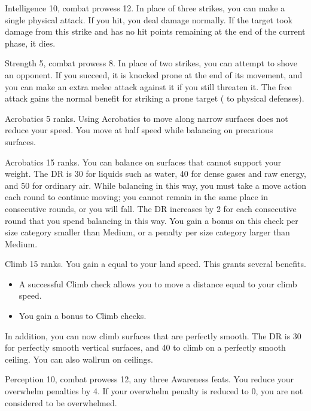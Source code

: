 \featpres Intelligence 10, combat prowess 12.
\featben In place of three strikes, you can make a single physical attack.
If you hit, you deal damage normally.
If the target took damage from this strike and has no hit points remaining at the end of the current phase, it dies.

\featpres Strength 5, combat prowess 8.
\featben In place of two strikes, you can attempt to shove an opponent.
If you succeed, it is knocked prone at the end of its movement, and you can make an extra melee attack against it if you still threaten it.
The free attack gains the normal benefit for striking a prone target ( to physical defenses).

\featpre Acrobatics 5 ranks.
\featben Using Acrobatics to move along narrow surfaces does not reduce your speed.
 You move at half speed while balancing on precarious surfaces.

\featpre Acrobatics 15 ranks.
\featben You can balance on surfaces that cannot support your weight.
The DR is 30 for liquids such as water, 40 for dense gases and raw energy, and 50 for ordinary air.
While balancing in this way, you must take a move action each round to continue moving; you cannot remain in the same place in consecutive rounds, or you will fall.
The DR increases by 2 for each consecutive round that you spend balancing in this way.
You gain a  bonus on this check per size category smaller than Medium, or a  penalty per size category larger than Medium.

\featpre Climb 15 ranks.
\featben You gain a  equal to your land speed.
This grants several benefits.
\begin{itemize}
    \item A successful Climb check allows you to move a distance equal to your climb speed.
    \item You gain a  bonus to Climb checks.
\end{itemize}

In addition, you can now climb surfaces that are perfectly smooth.
The DR is 30 for perfectly smooth vertical surfaces, and 40 to climb on a perfectly smooth ceiling.
You can also wallrun on ceilings.

\featpres Perception 10, combat prowess 12, any three Awareness feats.
\featben You reduce your overwhelm penalties by 4.
If your overwhelm penalty is reduced to 0, you are not considered to be overwhelmed.

